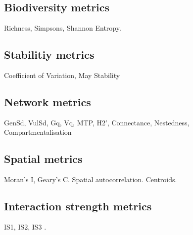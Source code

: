 \subsection{Biodiversity metrics}

Richness, Simpsons, Shannon Entropy.

\subsection{Stabilitiy metrics}

Coefficient of Variation, May Stability

\subsection{Network metrics}

GenSd, VulSd, Gq, Vq, MTP, H2', Connectance, Nestedness, Compartmentalisation

\subsection{Spatial metrics}

Moran's I, Geary's C. Spatial autocorrelation. Centroids.

\subsection{Interaction strength metrics}

IS1, IS2, IS3 \cite{berlow2004interaction}.
